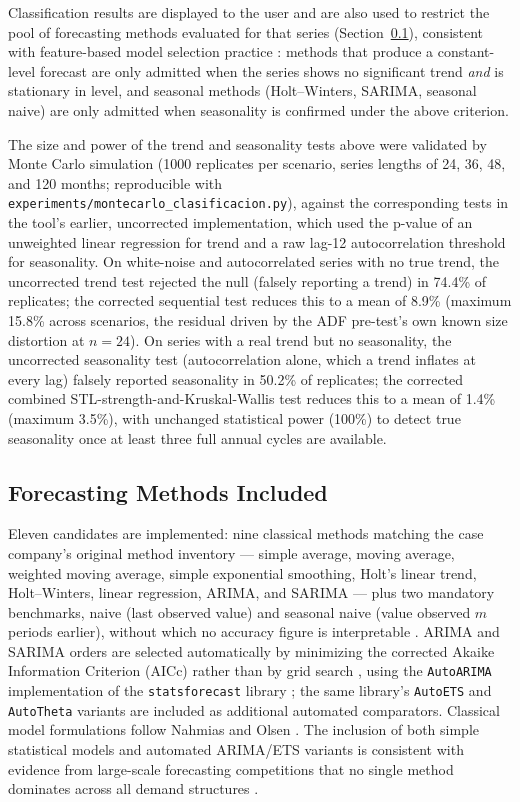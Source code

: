 \documentclass[forecasting,article,submit,pdftex,moreauthors]{Definitions/mdpi}
\begin{document}
Classification results are displayed to the user and are also used to restrict the pool of forecasting methods evaluated for that series (Section~\ref{sec:methodsincluded}), consistent with feature-based model selection practice \cite{monteromanso2020,talagala2021}: methods that produce a constant-level forecast are only admitted when the series shows no significant trend \emph{and} is stationary in level, and seasonal methods (Holt--Winters, SARIMA, seasonal naive) are only admitted when seasonality is confirmed under the above criterion.

The size and power of the trend and seasonality tests above were validated by Monte Carlo simulation (1000 replicates per scenario, series lengths of 24, 36, 48, and 120 months; reproducible with \texttt{experiments/montecarlo\_clasificacion.py}), against the corresponding tests in the tool's earlier, uncorrected implementation, which used the p-value of an unweighted linear regression for trend and a raw lag-12 autocorrelation threshold for seasonality. On white-noise and autocorrelated series with no true trend, the uncorrected trend test rejected the null (falsely reporting a trend) in 74.4\% of replicates; the corrected sequential test reduces this to a mean of 8.9\% (maximum 15.8\% across scenarios, the residual driven by the ADF pre-test's own known size distortion at $n=24$). On series with a real trend but no seasonality, the uncorrected seasonality test (autocorrelation alone, which a trend inflates at every lag) falsely reported seasonality in 50.2\% of replicates; the corrected combined STL-strength-and-Kruskal-Wallis test reduces this to a mean of 1.4\% (maximum 3.5\%), with unchanged statistical power (100\%) to detect true seasonality once at least three full annual cycles are available.

\subsection{Forecasting Methods Included}
\label{sec:methodsincluded}

Eleven candidates are implemented: nine classical methods matching the case company's original method inventory --- simple average, moving average, weighted moving average, simple exponential smoothing, Holt's linear trend, Holt--Winters, linear regression, ARIMA, and SARIMA --- plus two mandatory benchmarks, naive (last observed value) and seasonal naive (value observed $m$ periods earlier), without which no accuracy figure is interpretable \cite{hyndmankoehler2006}. ARIMA and SARIMA orders are selected automatically by minimizing the corrected Akaike Information Criterion (AICc) rather than by grid search \cite{hyndmankhandakar2008}, using the \texttt{AutoARIMA} implementation of the \texttt{statsforecast} library \cite{garza2022}; the same library's \texttt{AutoETS} and \texttt{AutoTheta} variants are included as additional automated comparators. Classical model formulations follow Nahmias and Olsen \cite{nahmias2015}. The inclusion of both simple statistical models and automated ARIMA/ETS variants is consistent with evidence from large-scale forecasting competitions that no single method dominates across all demand structures \cite{makridakis2020}.
\end{document}
